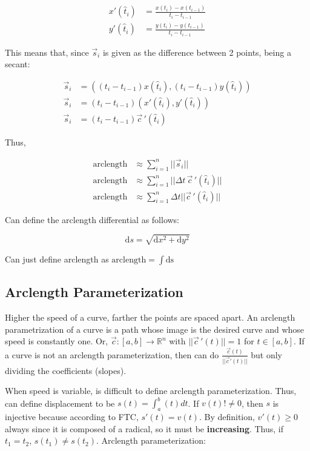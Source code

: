 \begin{align*}
    x'(\hat{t}_i)&=\frac{x(t_i)-x(t_{i-1})}{t_i-t_{i-1}}\\
    y'(\hat{t}_i)&=\frac{y(t_i)-y(t_{i-1})}{t_i-t_{i-1}}
\end{align*}

This means that, since $\vec{s}_i$ is given as the difference between 2 points,
being a secant:

\begin{align*}
    \vec{s}_i&=\left((t_i-t_{i-1})x(\hat{t}_i), (t_i-t_{i-1})y(\hat{t}_i)\right )\\
    \vec{s}_i&=(t_i-t_{i-1})\left(x'(\hat{t}_i),y'(\hat{t}_i)\right)\\
    \vec{s}_i&=(t_i-t_{i-1})\vec{c}\,'(\hat{t}_i)
\end{align*}

Thus,

\begin{align*}
    \mbox{arclength}&\approx\sum_{i=1}^n||\vec{s}_i||\\
    \mbox{arclength}&\approx\sum_{i=1}^n||\Delta t \,\vec{c}\,'(\hat{t}_i)||\\
    \mbox{arclength}&\approx\sum_{i=1}^n\Delta t||\vec{c}\,'(\hat{t}_i)||
\end{align*}

Can define the arclength differential as follows:

\[\mathrm{d}s=\sqrt{\mathrm{d}x^2+\mathrm{d}y^2}\]

Can just define arclength as $\text{arclength}=\int \mathrm{ds}$

\subsection{Arclength Parameterization}

Higher the speed of a curve, farther the points are spaced apart.
An arclength parametrization of a curve is a path whose image is the desired curve and whose speed is constantly one.
Or, $\vec{c}:[a,b]\to\mathbb{R}^n$ with $||\vec{c}\,'(t)||=1$ for $t\in[a,b]$.
If a curve is not an arclength parameterization, then can do $\frac{\vec{c}(t)}{||\vec{c}'(t)||}$ but only dividing the coefficients (slopes).\newline

\noindent
When speed is variable, is difficult to define arclength parameterization.
Thus, can define displacement to be $s(t)=\int_a^b (t)dt$. If $v(t)!\neq 0$,
then $s$ is injective because according to FTC, $s'(t)=v(t)$.
By definition, $v'(t)\geq 0$ always since it is composed of a radical, so it must be \textbf{increasing}.
Thus, if $t_1=t_2$, $s(t_1)\neq s(t_2)$. Arclength parameterization:

